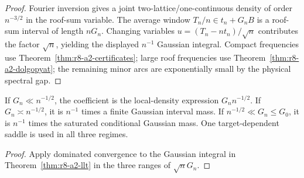 \begin{proof}
Fourier inversion gives a joint two-lattice/one-continuous density of order
$n^{-3/2}$ in the roof-sum variable.  The average window
$T_n/n\in t_n+G_nB$ is a roof-sum interval of length $nG_n$.  Changing variables
$u=(T_n-nt_n)/\sqrt n$ contributes the factor $\sqrt n$, yielding the displayed
$n^{-1}$ Gaussian integral.  Compact frequencies use
Theorem~\ref{thm:r8-a2-certificates}; large roof frequencies use
Theorem~\ref{thm:r8-a2-dolgopyat}; the remaining minor arcs are exponentially
small by the physical spectral gap.
\end{proof}

\begin{corollary}
\label{cor:r8-a2-regimes}
If $G_n\ll n^{-1/2}$, the coefficient is the local-density expression
$G_n n^{-1/2}$.  If $G_n\asymp n^{-1/2}$, it is $n^{-1}$ times a finite Gaussian
interval mass.  If $n^{-1/2}\ll G_n\le G_0$, it is $n^{-1}$ times the saturated
conditional Gaussian mass.  One target-dependent saddle is used in all three
regimes.
\end{corollary}

\begin{proof}
Apply dominated convergence to the Gaussian integral in
Theorem~\ref{thm:r8-a2-llt} in the three ranges of $\sqrt nG_n$.
\end{proof}
